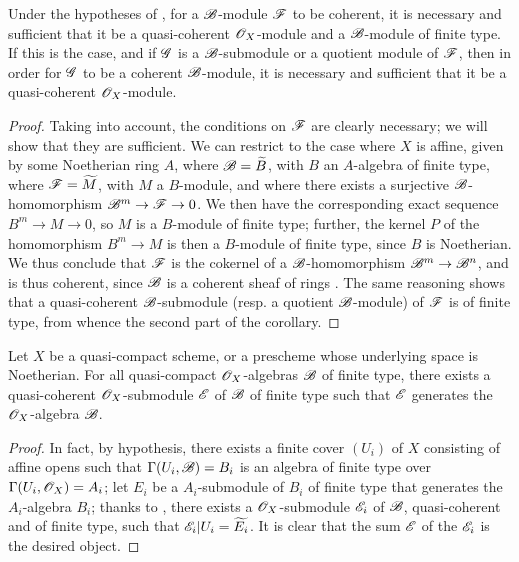 \begin{corollary}[9.6.4]
\label{I.9.6.4}
Under the hypotheses of , for a $\mathscr{B}$-module $\mathscr{F}$ to be coherent, it is necessary and sufficient that it be a quasi-coherent $\mathscr{O}_X$-module and a $\mathscr{B}$-module of finite type.
If this is the case, and if $\mathscr{G}$ is a $\mathscr{B}$-submodule or a quotient module of $\mathscr{F}$, then in order for $\mathscr{G}$ to be a coherent $\mathscr{B}$-module, it is necessary and sufficient that it be a quasi-coherent $\mathscr{O}_X$-module.
\end{corollary}

\begin{proof}
Taking  into account, the conditions on $\mathscr{F}$ are clearly necessary; we will show that they are sufficient.
We can restrict to the case where $X$ is affine, given by some Noetherian ring $A$, where $\mathscr{B}=\widetilde{B}$, with $B$ an $A$-algebra of finite type, where $\mathscr{F}=\widetilde{M}$, with $M$ a $B$-module, and where there exists a surjective $\mathscr{B}$-homomorphism $\sh{B}^m\to\sh{F}\to0$.
We then have the corresponding exact sequence $B^m\to M\to0$, so $M$ is a $B$-module of finite type; further, the kernel $P$ of the homomorphism $B^m\to M$ is then a $B$-module of finite type, since $B$ is Noetherian.
We thus conclude  that $\mathscr{F}$ is the cokernel of a $\mathscr{B}$-homomorphism $\sh{B}^m\to\sh{B}^n$, and is thus coherent, since $\mathscr{B}$ is a coherent sheaf of rings .
The same reasoning shows that a quasi-coherent $\mathscr{B}$-submodule (resp. a quotient $\mathscr{B}$-module) of $\mathscr{F}$ is of finite type, from whence the second part of the corollary.
\end{proof}

\begin{proposition}[9.6.5]
\label{I.9.6.5}
Let $X$ be a quasi-compact scheme, or a prescheme whose underlying space is Noetherian.
For all quasi-compact $\mathscr{O}_X$-algebras $\mathscr{B}$ of finite type, there exists a quasi-coherent $\mathscr{O}_X$-submodule $\mathscr{E}$ of $\mathscr{B}$ of finite type such that $\mathscr{E}$ generates  the $\mathscr{O}_X$-algebra $\mathscr{B}$.
\end{proposition}

\begin{proof}
In fact, by hypothesis, there exists a finite cover $(U_i)$ of $X$ consisting of affine opens such that $\Gamma(U_i,\mathscr{B})=B_i$ is an algebra of finite type over $\Gamma(U_i,\mathscr{O}_X)=A_i$; let $E_i$ be a $A_i$-submodule of $B_i$ of finite type that generates the $A_i$-algebra $B_i$; thanks to , there exists a $\mathscr{O}_X$-submodule $\mathscr{E}_i$ of $\mathscr{B}$, quasi-coherent and of finite type, such that $\mathscr{E}_i|U_i=\widetilde{E_i}$.
It is clear that the sum $\mathscr{E}$ of the $\mathscr{E}_i$ is the desired object.
\end{proof}


